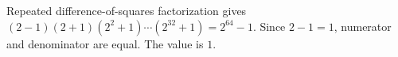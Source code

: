Repeated difference-of-squares factorization gives $(2-1)(2+1)(2^2+1)\cdots(2^{32}+1)=2^{64}-1$. Since $2-1=1$, numerator and denominator are equal. The value is $\boxed1$.

